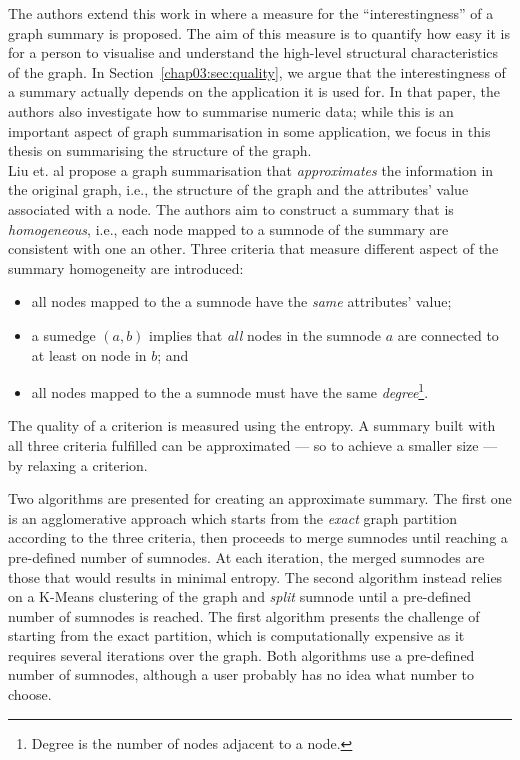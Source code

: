 The authors extend this work in \cite{zhang:2010:ddg} where a measure for the ``interestingness'' of a graph summary is proposed. The aim of this measure is to quantify how easy it is for a person to visualise and understand the high-level structural characteristics of the graph. In Section~\ref{chap03:sec:quality}, we argue that the interestingness of a summary actually depends on the application it is used for. In that paper, the authors also investigate how to summarise numeric data; while this is an important aspect of graph summarisation in some application, we focus in this thesis on summarising the structure of the graph.\\

Liu et. al \cite{zheng:ipsj:2011} propose a graph summarisation that \emph{approximates} the information in the original graph, i.e., the structure of the graph and the attributes' value associated with a node. The authors aim to construct a summary that is \emph{homogeneous}, i.e., each node mapped to a sumnode of the summary are consistent with one an other. Three criteria that measure different aspect of the summary homogeneity are introduced:
\begin{itemize}
	\item all nodes mapped to the a sumnode have the \emph{same} attributes' value;
	\item a sumedge $(a,b)$ implies that \emph{all} nodes in the sumnode $a$ are connected to at least on node in $b$; and
	\item all nodes mapped to the a sumnode must have the same \emph{degree}\footnote{Degree is the number of nodes adjacent to a node.}.
\end{itemize}
The quality of a criterion is measured using the entropy. A summary built with all three criteria fulfilled can be approximated --- so to achieve a smaller size --- by relaxing a criterion.

Two algorithms are presented for creating an approximate summary. The first one is an agglomerative approach which starts from the \emph{exact} graph partition according to the three criteria, then proceeds to merge sumnodes until reaching a pre-defined number of sumnodes. At each iteration, the merged sumnodes are those that would results in minimal entropy. The second algorithm instead relies on a K-Means clustering of the graph and \emph{split} sumnode until a pre-defined number of sumnodes is reached. The first algorithm presents the challenge of starting from the exact partition, which is computationally expensive as it requires several iterations over the graph. Both algorithms use a pre-defined number of sumnodes, although a user probably has no idea what number to choose.\\

